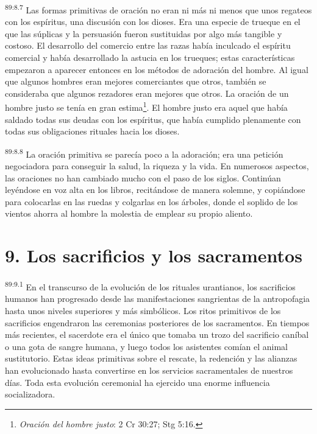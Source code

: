 \documentclass[twoside, 11pt]{book}
\begin{document}
\par
\textsuperscript{89:8.7} Las formas primitivas de oración no eran ni más ni menos que unos regateos con los espíritus, una discusión con los dioses. Era una especie de trueque en el que las súplicas y la persuasión fueron sustituidas por algo más tangible y costoso. El desarrollo del comercio entre las razas había inculcado el espíritu comercial y había desarrollado la astucia en los trueques; estas características empezaron a aparecer entonces en los métodos de adoración del hombre. Al igual que algunos hombres eran mejores comerciantes que otros, también se consideraba que algunos rezadores eran mejores que otros. La oración de un hombre justo se tenía en gran estima\footnote{\textit{Oración del hombre justo}: 2 Cr 30:27; Stg 5:16.}. El hombre justo era aquel que había saldado todas sus deudas con los espíritus, que había cumplido plenamente con todas sus obligaciones rituales hacia los dioses.

\par
\textsuperscript{89:8.8} La oración primitiva se parecía poco a la adoración; era una petición negociadora para conseguir la salud, la riqueza y la vida. En numerosos aspectos, las oraciones no han cambiado mucho con el paso de los siglos. Continúan leyéndose en voz alta en los libros, recitándose de manera solemne, y copiándose para colocarlas en las ruedas y colgarlas en los árboles, donde el soplido de los vientos ahorra al hombre la molestia de emplear su propio aliento.

\section*{9. Los sacrificios y los sacramentos}
\par
\textsuperscript{89:9.1} En el transcurso de la evolución de los rituales urantianos, los sacrificios humanos han progresado desde las manifestaciones sangrientas de la antropofagia hasta unos niveles superiores y más simbólicos. Los ritos primitivos de los sacrificios engendraron las ceremonias posteriores de los sacramentos. En tiempos más recientes, el sacerdote era el único que tomaba un trozo del sacrificio caníbal o una gota de sangre humana, y luego todos los asistentes comían el animal sustitutorio. Estas ideas primitivas sobre el rescate, la redención y las alianzas han evolucionado hasta convertirse en los servicios sacramentales de nuestros días. Toda esta evolución ceremonial ha ejercido una enorme influencia socializadora.
\end{document}

